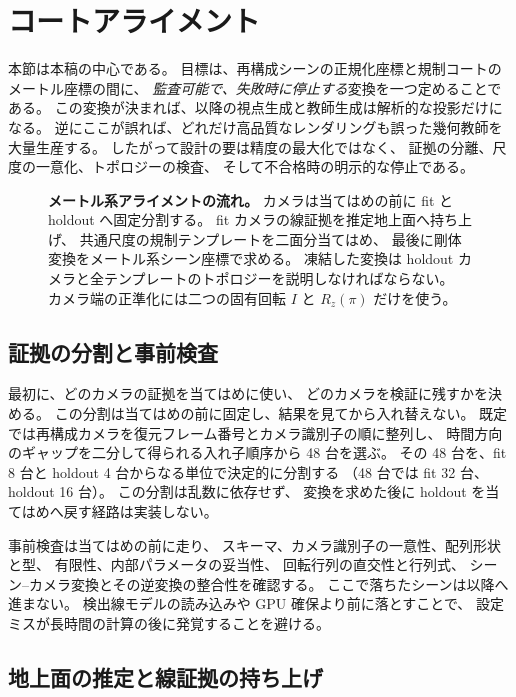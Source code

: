 \section{コートアライメント}
\label{sec:alignment}

本節は本稿の中心である。
目標は、再構成シーンの正規化座標と規制コートのメートル座標の間に、
\emph{監査可能で、失敗時に停止する}変換を一つ定めることである。
この変換が決まれば、以降の視点生成と教師生成は解析的な投影だけになる。
逆にここが誤れば、どれだけ高品質なレンダリングも誤った幾何教師を大量生産する。
したがって設計の要は精度の最大化ではなく、
証拠の分離、尺度の一意化、トポロジーの検査、
そして不合格時の明示的な停止である。

\begin{figure}[t]
  \centering
  \resizebox{\linewidth}{!}{}
  \caption{\textbf{メートル系アライメントの流れ。}
  カメラは当てはめの前に fit と holdout へ固定分割する。
  fit カメラの線証拠を推定地上面へ持ち上げ、
  共通尺度の規制テンプレートを二面分当てはめ、
  最後に剛体変換をメートル系シーン座標で求める。
  凍結した変換は holdout カメラと全テンプレートのトポロジーを説明しなければならない。
  カメラ端の正準化には二つの固有回転 \(I\) と \(R_z(\pi)\) だけを使う。
  }
  \label{fig:alignment}
\end{figure}

\subsection{証拠の分割と事前検査}
\label{sec:evidence_split}

最初に、どのカメラの証拠を当てはめに使い、
どのカメラを検証に残すかを決める。
この分割は当てはめの前に固定し、結果を見てから入れ替えない。
既定では再構成カメラを復元フレーム番号とカメラ識別子の順に整列し、
時間方向のギャップを二分して得られる入れ子順序から 48 台を選ぶ。
その 48 台を、fit 8 台と holdout 4 台からなる単位で決定的に分割する
（48 台では fit 32 台、holdout 16 台）。
この分割は乱数に依存せず、
変換を求めた後に holdout を当てはめへ戻す経路は実装しない。

事前検査は当てはめの前に走り、
スキーマ、カメラ識別子の一意性、配列形状と型、
有限性、内部パラメータの妥当性、
回転行列の直交性と行列式、
シーン--カメラ変換とその逆変換の整合性を確認する。
ここで落ちたシーンは以降へ進まない。
検出線モデルの読み込みや GPU 確保より前に落とすことで、
設定ミスが長時間の計算の後に発覚することを避ける。

\subsection{地上面の推定と線証拠の持ち上げ}
\label{sec:ground_plane}

